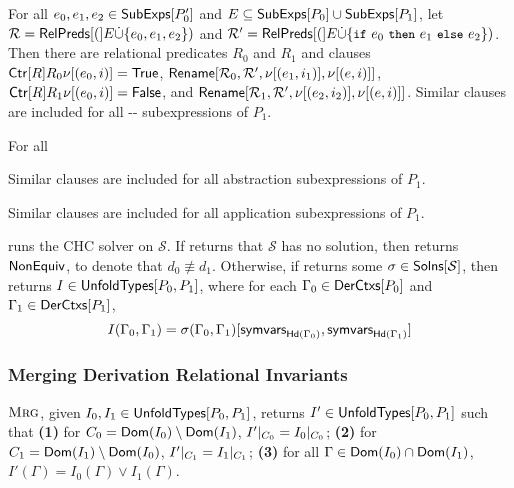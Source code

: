 %
%
For all $e_0, e_1, e_2 \in \mathsf{SubExps}[  P_0'  ]$ and $E \subseteq
\mathsf{SubExps}[  P_0  ] \cup \mathsf{SubExps}[  P_1  ]$, let $\mathcal{R} =
\mathsf{RelPreds}[ ( ]E \dot{\cup} \{  e_0, e_1, e_2  \})$ and $\mathcal{R}' =
\symrelpreds(E \disjunion \elts{ \ite{e_0}{e_1}{e_2} })$.
%
Then there are relational predicates $R_0$ and $R_1$ and clauses
$\mathsf{Ctr}[  R  ]{ R_0 }{ \nu[  (e_0, i)  ] = \mathsf{True}}$,
%
$\mathsf{Rename}[  \mathcal{R}_0 ,  \mathcal{ R }' ,  \nu[  (e_1, i_1)  ]
,  \nu[ (e, i) ]  ]$,
%
$\mathsf{Ctr}[  R  ]{ R_1 }{ \nu[  (e_0, i)  ] = \mathsf{False}}$, and
%
$\mathsf{Rename}[  \mathcal{R}_1 ,  \mathcal{ R }' ,  \nu[  (e_2, i_2)  ]
,  \nu[  (e, i)  ]  ]$.
%
Similar clauses are included for all --
subexpressions of $P_1$.

%
For all 

Similar clauses are included for all abstraction subexpressions of
$P_1$.


Similar clauses are included for all application subexpressions of
$P_1$.


\verifyunfoldings runs the CHC solver \solvechc on $\mathcal{S}$.
%
If \solvechc returns that $\mathcal{S}$ has no solution, then
\verifyunfoldings returns $\mathsf{NonEquiv}$, to denote that $d_0 \not\equiv d_1$.
%
Otherwise, if \solvechc returns some $\sigma \in \mathsf{Solns}[ 
  \mathcal{S}  ]$, then \verifyunfoldings returns $I \in
\mathsf{UnfoldTypes}[ P_0, P_1 ]$, where for each $\Gamma_0 \in \mathsf{DerCtxs}[  P_0
 ]$ and $\Gamma_1 \in \mathsf{DerCtxs}[  P_1  ]$,
\[ I(\Gamma_0, \Gamma_1) = %
\subs{ \sigma(\Gamma_0, \Gamma_1) }{ %
  \symvars{ \headexps( \Gamma_0 ) }, %
  \symvars{ \headexps( \Gamma_1 ) } } \]

\subsubsection{Merging Derivation Relational Invariants}
\label{sec:merge}
$\textsc{Mrg}$, given $I_0, I_1 \in \mathsf{UnfoldTypes}[ P_0, P_1 ]$, returns $I'
\in \mathsf{UnfoldTypes}[ P_0, P_1 ]$ such that
\textbf{(1)} for $C_0 = \mathsf{Dom}(I_0) \setminus \mathsf{Dom}(I_1)$,
$I'|_{C_0} = I_0|_{C_0}$; 
\textbf{(2)} for $C_1 = \mathsf{Dom}(I_1) \setminus \mathsf{Dom}(I_0)$,
$I'|_{C_1} = I_1|_{C_1}$;
\textbf{(3)} for all $\Gamma \in \mathsf{Dom}(I_0) \cap
\mathsf{Dom}(I_1)$, $I'(\Gamma) = I_0(\Gamma) \lor I_1(\Gamma)$.


